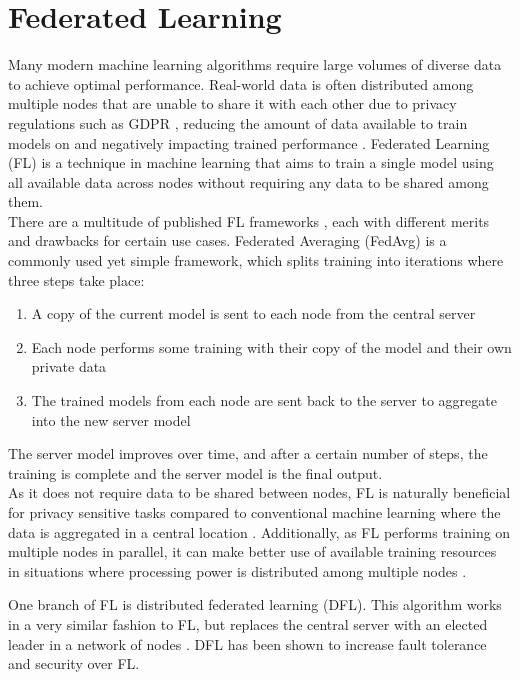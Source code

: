 \section{Federated Learning}
Many modern machine learning algorithms require large volumes of diverse data to achieve optimal performance. Real-world data is often distributed among multiple nodes that are unable to share it with each other due to privacy regulations such as GDPR \cite{gdpr}, reducing the amount of data available to train models on and negatively impacting trained performance \cite{data_volume}. Federated Learning (FL) \cite{survey_on_fed_learning} is a technique in machine learning that aims to train a single model using all available data across nodes without requiring any data to be shared among them. \\

There are a multitude of published FL frameworks \cite{fed_table_survey}, each with different merits and drawbacks for certain use cases. Federated Averaging (FedAvg) \cite{fed_learning} is a commonly used yet simple framework, which splits training into iterations where three steps take place:
\begin{enumerate}
	\item A copy of the current model is sent to each node from the central server
	\item Each node performs some training with their copy of the model and their own private data
	\item The trained models from each node are sent back to the server to aggregate into the new server model
\end{enumerate}
The server model improves over time, and after a certain number of steps, the training is complete and the server model is the final output. \\

As it does not require data to be shared between nodes, FL is naturally beneficial for privacy sensitive tasks compared to conventional machine learning where the data is aggregated in a central location \citeme. Additionally, as FL performs training on multiple nodes in parallel, it can make better use of available training resources in situations where processing power is distributed among multiple nodes \citeme.

One branch of FL is distributed federated learning (DFL). This algorithm works in a very similar fashion to FL, but replaces the central server with an elected leader in a network of nodes \cite{leaderelec_car}. DFL has been shown to increase fault tolerance and security over FL.


